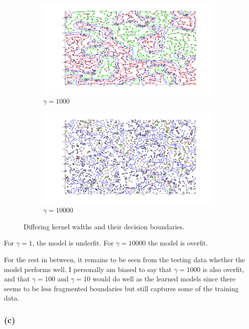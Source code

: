 \documentclass[letterpaper,10pt]{article} %
\begin{document}
\begin{figure}[h]
\begin{subfigure}[b]{\textwidth}
\includegraphics[width=\textwidth]{figs/p2-1d}
\caption{$\gamma = 1000$}
\label{fig:p2d}
\end{subfigure}

\begin{subfigure}[b]{\textwidth}
\includegraphics[width=\textwidth]{figs/p2-1e}
\caption{$\gamma = 10000$}
\label{fig:p2e}
\end{subfigure}

\caption{Differing kernel widths and their decision boundaries.}\label{fig:p2}
\end{figure}

For $\gamma = 1$, the model is underfit. For $\gamma = 10000$ the model is overfit.

For the rest in between, it remains to be seen from the testing data whether the model performs well. I personally am biased to say that $\gamma = 1000$ is also overfit, and that $\gamma = 100$ and $\gamma = 10$ would do well as the learned models since there seems to be less fragmented boundaries but still captures some of the training data.

\subsubsection*{(c)}
\end{document}

